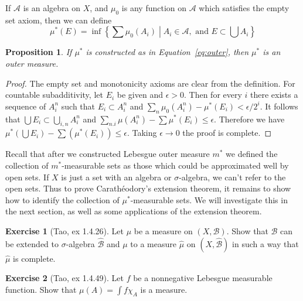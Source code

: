 \documentclass[10pt,oneside]{amsbook}
\newcommand{\NN}{{\mathbb N}}
\theoremstyle{definition}
\newtheorem{exerc}{Exercise}[section]
\theoremstyle{plain}
\newtheorem{prop}[thm]{Proposition}
\theoremstyle{definition}
\theoremstyle{remark}
\numberwithin{equation}{section}
\numberwithin{figure}{section}
\begin{document}
If $\mathcal A$ is an algebra on $X$, and $\mu_0$ is any function on $\mathcal A$ which satisfies the empty set axiom, then we can define
\begin{equation}
  \label{eq:outer}
  \mu^*(E)=\inf\left\{\left.\sum\mu_0(A_i)\;\right|\;A_i\in\mathcal A,\text{ and }E\subset\bigcup A_i\right\}
\end{equation}

\begin{prop}
  If $\mu^*$ is constructed as in Equation~\eqref{eq:outer}, then $\mu^*$ is an outer measure.
\end{prop}

\begin{proof}
  The empty set and monotonicity axioms are clear from the definition. For countable subadditivity, let $E_i$ be given and $\epsilon>0$. Then for every $i$ there exists a sequence of $A_i^n$ such that $E_i\subset A_i^n$ and $\sum_n\mu_0(A_i^n)-\mu^*(E_i)<\epsilon/2^i$. It follows that $\bigcup E_i\subset\bigcup_{i,n} A_i^n$ and $\sum_{n.i}\mu(A_i^n)-\sum\mu^*(E_i)\leq\epsilon$. Therefore we have $\mu^*(\bigcup E_i)-\sum(\mu^*(E_i))\leq\epsilon$. Taking $\epsilon\to0$ the proof is complete.
\end{proof}

Recall that after we constructed Lebesgue outer measure $m^*$ we defined the collection of $m^*$-measurable sets as those which could be approximated well by open sets. If $X$ is just a set with an algebra or $\sigma$-algebra, we can't refer to the open sets. Thus to prove Carath\'eodory's extension theorem, it remains to show how to identify the collection of $\mu^*$-measurable sets. We will investigate this in the next section, as well as some applications of the extension theorem.

\begin{exerc}[Tao, ex 1.4.26]
  Let $\mu$ be a measure on $(X,\mathcal B)$. Show that $\mathcal B$ can be extended to $\sigma$-algebra $\hat{\mathcal B}$ and $\mu$ to a measure $\hat\mu$ on $(X,\hat{\mathcal B})$ in such a way that $\hat\mu$ is complete.
\end{exerc}

\begin{exerc}[Tao, ex 1.4.49]
  Let $f$ be a nonnegative Lebesgue measurable function. Show that $\mu(A)=\int f\chi_A$ is a measure.
\end{exerc}


\end{document}
